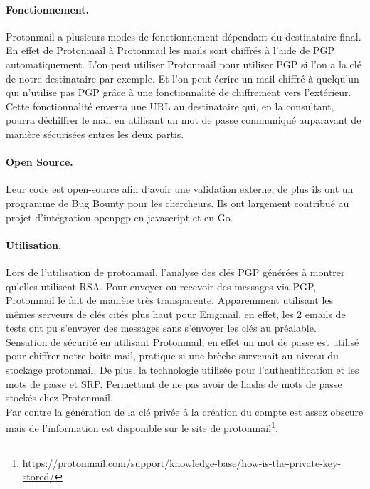 \paragraph*{Fonctionnement.}
Protonmail a plusieurs modes de fonctionnement dépendant du destinataire final. En effet de Protonmail à Protonmail les mails sont chiffrés à l'aide de PGP automatiquement. L'on peut utiliser Protonmail pour utiliser PGP si l'on a la clé de notre destinataire par exemple. Et l'on peut écrire un mail chiffré à quelqu'un qui n'utilise pas PGP grâce à une fonctionnalité de chiffrement vers l'extérieur.
Cette fonctionnalité enverra une URL au destinataire qui, en la consultant, pourra déchiffrer le mail en utilisant un mot de passe communiqué auparavant de manière sécurisées entres les deux partis.
\paragraph*{Open Source.}
Leur code est open-source afin d'avoir une validation externe, de plus ils ont un programme de Bug Bounty pour les chercheurs. Ils ont largement contribué au projet d'intégration openpgp en javascript et en Go.

\paragraph*{Utilisation.}
Lors de l'utilisation de protonmail, l'analyse des clés PGP générées à montrer qu'elles utilisent RSA. Pour envoyer ou recevoir des messages via PGP, Protonmail le fait de manière très transparente. Apparemment utilisant les mêmes serveurs de clés cités plus haut pour Enigmail, en effet, les 2 emails de tests ont pu s'envoyer des messages sans s'envoyer les clés au préalable.\\
Sensation de sécurité en utilisant Protonmail, en effet un mot de passe est utilisé pour chiffrer notre boite mail, pratique si une brèche survenait au niveau du stockage protonmail. De plus, la technologie utilisée pour l'authentification et les mots de passe et SRP. Permettant de ne pas avoir de hashs de mots de passe stockés chez Protonmail.\\
Par contre la génération de la clé privée à la création du compte est assez obscure mais de l'information est disponible sur le site de protonmail\footnote{\url{https://protonmail.com/support/knowledge-base/how-is-the-private-key-stored/}}.\\
